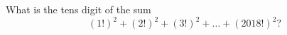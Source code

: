 What is the tens digit of the sum \[\left(1!\right)^2+\left(2!\right)^2+\left(3!\right)^2+\ldots+\left(2018!\right)^2?\]